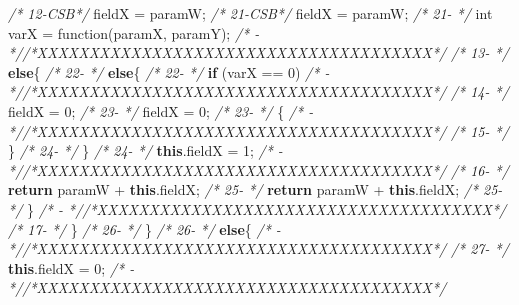 \documentclass[
]{article}
\newenvironment{Shaded}{\begin{snugshade}}{\end{snugshade}}
\newcommand{\CommentTok}[1]{\textcolor[rgb]{0.56,0.35,0.01}{\textit{#1}}}
\newcommand{\DataTypeTok}[1]{\textcolor[rgb]{0.13,0.29,0.53}{#1}}
\newcommand{\DecValTok}[1]{\textcolor[rgb]{0.00,0.00,0.81}{#1}}
\newcommand{\FunctionTok}[1]{\textcolor[rgb]{0.00,0.00,0.00}{#1}}
\newcommand{\KeywordTok}[1]{\textcolor[rgb]{0.13,0.29,0.53}{\textbf{#1}}}
\newcommand{\NormalTok}[1]{#1}
\begin{document}
\begin{landscape}
\begin{Shaded}
\begin{Highlighting}[]
\CommentTok{/* 12-CSB*/}\NormalTok{            fieldX = paramW;                             }\CommentTok{/* 21-CSB*/}\NormalTok{            fieldX = paramW;                             }
\CommentTok{/* 21-   */}        \DataTypeTok{int}\NormalTok{ varX = }\FunctionTok{function}\NormalTok{(paramX, paramY);                  }\CommentTok{/*   -   *//*XXXXXXXXXXXXXXXXXXXXXXXXXXXXXXXXXXXXXX*/}               
\CommentTok{/* 13-   */}        \KeywordTok{else}\NormalTok{\{                                            }\CommentTok{/* 22-   */}        \KeywordTok{else}\NormalTok{\{                                            }
\CommentTok{/* 22-   */}        \KeywordTok{if}\NormalTok{ (varX == }\DecValTok{0}\NormalTok{)                                   }\CommentTok{/*   -   *//*XXXXXXXXXXXXXXXXXXXXXXXXXXXXXXXXXXXXXX*/}               
\CommentTok{/* 14-   */}\NormalTok{            fieldX = }\DecValTok{0}\NormalTok{;                                  }\CommentTok{/* 23-   */}\NormalTok{            fieldX = }\DecValTok{0}\NormalTok{;                                  }
\CommentTok{/* 23-   */}\NormalTok{        \{                                                }\CommentTok{/*   -   *//*XXXXXXXXXXXXXXXXXXXXXXXXXXXXXXXXXXXXXX*/}               
\CommentTok{/* 15-   */}\NormalTok{        \}                                                }\CommentTok{/* 24-   */}\NormalTok{        \}                                                }
\CommentTok{/* 24-   */}            \KeywordTok{this}\NormalTok{.}\FunctionTok{fieldX}\NormalTok{ = }\DecValTok{1}\NormalTok{;                             }\CommentTok{/*   -   *//*XXXXXXXXXXXXXXXXXXXXXXXXXXXXXXXXXXXXXX*/}               
\CommentTok{/* 16-   */}        \KeywordTok{return}\NormalTok{ paramW + }\KeywordTok{this}\NormalTok{.}\FunctionTok{fieldX}\NormalTok{;                     }\CommentTok{/* 25-   */}        \KeywordTok{return}\NormalTok{ paramW + }\KeywordTok{this}\NormalTok{.}\FunctionTok{fieldX}\NormalTok{;                     }
\CommentTok{/* 25-   */}\NormalTok{        \}                                                            }\CommentTok{/*   -   *//*XXXXXXXXXXXXXXXXXXXXXXXXXXXXXXXXXXXXXX*/}               
\CommentTok{/* 17-   */}\NormalTok{     \}                                                   }\CommentTok{/* 26-   */}\NormalTok{     \}                                                   }
\CommentTok{/* 26-   */}        \KeywordTok{else}\NormalTok{\{                                            }\CommentTok{/*   -   *//*XXXXXXXXXXXXXXXXXXXXXXXXXXXXXXXXXXXXXX*/}               
\CommentTok{/* 27-   */}            \KeywordTok{this}\NormalTok{.}\FunctionTok{fieldX}\NormalTok{ = }\DecValTok{0}\NormalTok{;                             }\CommentTok{/*   -   *//*XXXXXXXXXXXXXXXXXXXXXXXXXXXXXXXXXXXXXX*/}               

\end{Highlighting}
\end{Shaded}
\end{landscape}
\end{document}
